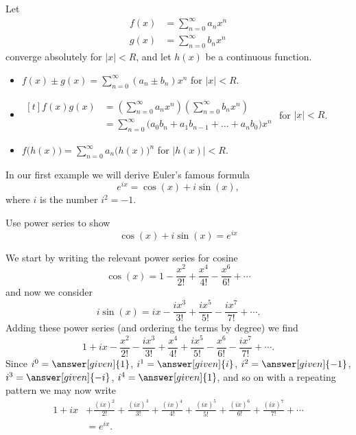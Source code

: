 \documentclass{ximera}
\begin{document}
\begin{theorem}
  Let
  \begin{align*}
    f(x) &= \sum_{n=0}^\infty a_nx^n\\
    g(x) &= \sum_{n=0}^\infty b_nx^n
  \end{align*}
  converge absolutely for $|x|<R$, and let $h(x)$ be a continuous function.
  \begin{itemize}
	\item $f(x)\pm g(x) = \sum_{n=0}^\infty (a_n\pm b_n)x^n$ \quad for $|x|<R$.
	\item $\begin{aligned}[t]
	f(x)g(x) &= \left(\sum_{n=0}^\infty a_nx^n\right)\left(\sum_{n=0}^\infty b_nx^n\right)\\
	      &= \sum_{n=0}^\infty\big(a_0b_n+a_1b_{n-1}+\dots + a_nb_0\big)x^n
		\end{aligned}$ for $|x|<R$.%
	\item $f\big(h(x)\big) = \sum_{n=0}^\infty a_n\big(h(x)\big)^n$ \quad for $|h(x)|<R$.
  \end{itemize}
\end{theorem}

In our first example we will derive Euler's famous formula
\[
e^{ix} = \cos(x) + i \sin(x),
\]
where $i$ is the number $i^2=-1$.

\begin{example}
  Use power series to show
  \[
  \cos(x) + i \sin(x) = e^{ix} 
  \]
  \begin{explanation}
    We start by writing the relevant power series for cosine
    \[
    \cos(x) = 1-\frac{x^2}{2!} + \frac{x^4}{4!} -\frac{x^6}{6!} + \cdots
    \]
    and now we consider
    \[
    i \sin(x) = ix - \frac{ix^3}{3!} + \frac{ix^5}{5!} -\frac{i x^7}{7!} + \cdots.
    \]
    Adding these power series (and ordering the terms by degree) we find
    \[
    1+ ix -\frac{x^2}{2!} - \frac{ix^3}{3!} + \frac{x^4}{4!} + \frac{ix^5}{5!} -\frac{x^6}{6!} -\frac{i x^7}{7!} + \cdots.
    \]
    Since $i^0=\answer[given]{1}$,
    $i^1= \answer[given]{i}$,
    $i^2 = \answer[given]{-1}$,
    $i^3 = \answer[given]{-i}$,
    $i^4 = \answer[given]{1}$, and so on with a repeating pattern we may now write
    \begin{align*}
      1+ ix &+\frac{(ix)^2}{2!} + \frac{(ix)^3}{3!} + \frac{(ix)^4}{4!} + \frac{(ix)^5}{5!} +\frac{(ix)^6}{6!} +\frac{(i x)^7}{7!} + \cdots\\
      &= e^{ix}.
    \end{align*}
  \end{explanation}
\end{example}
\end{document}
